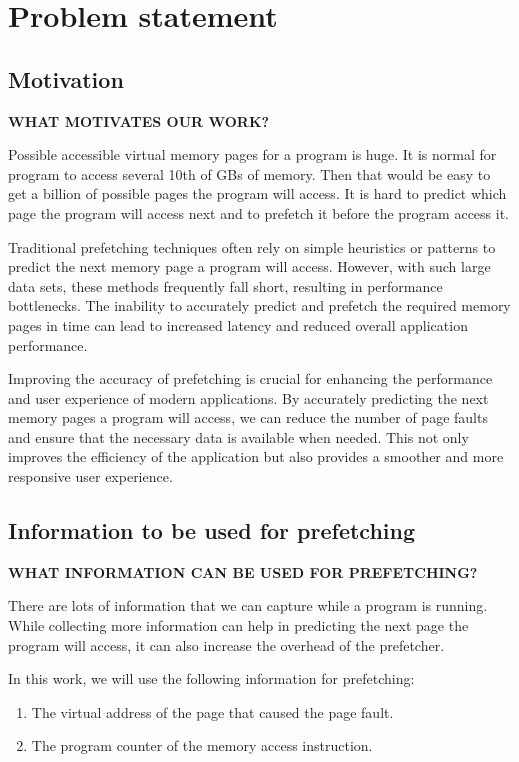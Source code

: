 
\section{Problem statement}\label{sec:3}

\subsection{Motivation}
\textbf{WHAT MOTIVATES OUR WORK?}

Possible accessible virtual memory pages for a program is huge. It is normal for program to access several 10th of GBs of memory. Then that would be easy to get a billion of possible pages the program will access. It is hard to predict which page the program will access next and to prefetch it before the program access it.

Traditional prefetching techniques often rely on simple heuristics or patterns to predict the next memory page a program will access. However, with such large data sets, these methods frequently fall short, resulting in performance bottlenecks. The inability to accurately predict and prefetch the required memory pages in time can lead to increased latency and reduced overall application performance.

Improving the accuracy of prefetching is crucial for enhancing the performance and user experience of modern applications. By accurately predicting the next memory pages a program will access, we can reduce the number of page faults and ensure that the necessary data is available when needed. This not only improves the efficiency of the application but also provides a smoother and more responsive user experience.

\subsection{Information to be used for prefetching}

\textbf{WHAT INFORMATION CAN BE USED FOR PREFETCHING?}

There are lots of information that we can capture while a program is running. While collecting more information can help in predicting the next page the program will access, it can also increase the overhead of the prefetcher.

In this work, we will use the following information for prefetching:
\begin{enumerate}
    \item The virtual address of the page that caused the page fault.
    \item The program counter of the memory access instruction.
\end{enumerate}

